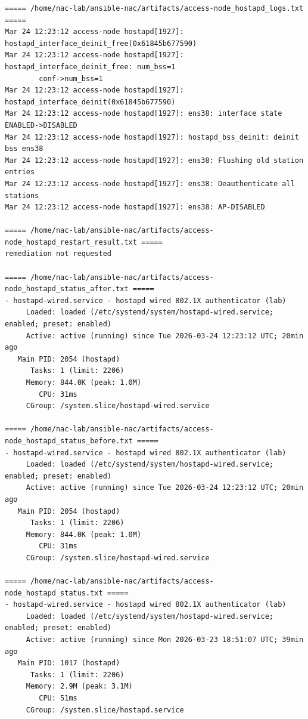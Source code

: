 \documentclass[11pt]{article}
\begin{document}
\begin{verbatim}
===== /home/nac-lab/ansible-nac/artifacts/access-node_hostapd_logs.txt =====
Mar 24 12:23:12 access-node hostapd[1927]: hostapd_interface_deinit_free(0x61845b677590)
Mar 24 12:23:12 access-node hostapd[1927]: hostapd_interface_deinit_free: num_bss=1 
        conf->num_bss=1
Mar 24 12:23:12 access-node hostapd[1927]: hostapd_interface_deinit(0x61845b677590)
Mar 24 12:23:12 access-node hostapd[1927]: ens38: interface state ENABLED->DISABLED
Mar 24 12:23:12 access-node hostapd[1927]: hostapd_bss_deinit: deinit bss ens38
Mar 24 12:23:12 access-node hostapd[1927]: ens38: Flushing old station entries
Mar 24 12:23:12 access-node hostapd[1927]: ens38: Deauthenticate all stations
Mar 24 12:23:12 access-node hostapd[1927]: ens38: AP-DISABLED

===== /home/nac-lab/ansible-nac/artifacts/access-node_hostapd_restart_result.txt =====
remediation not requested

===== /home/nac-lab/ansible-nac/artifacts/access-node_hostapd_status_after.txt =====
- hostapd-wired.service - hostapd wired 802.1X authenticator (lab)
     Loaded: loaded (/etc/systemd/system/hostapd-wired.service; enabled; preset: enabled)
     Active: active (running) since Tue 2026-03-24 12:23:12 UTC; 20min ago
   Main PID: 2054 (hostapd)
      Tasks: 1 (limit: 2206)
     Memory: 844.0K (peak: 1.0M)
        CPU: 31ms
     CGroup: /system.slice/hostapd-wired.service

===== /home/nac-lab/ansible-nac/artifacts/access-node_hostapd_status_before.txt =====
- hostapd-wired.service - hostapd wired 802.1X authenticator (lab)
     Loaded: loaded (/etc/systemd/system/hostapd-wired.service; enabled; preset: enabled)
     Active: active (running) since Tue 2026-03-24 12:23:12 UTC; 20min ago
   Main PID: 2054 (hostapd)
      Tasks: 1 (limit: 2206)
     Memory: 844.0K (peak: 1.0M)
        CPU: 31ms
     CGroup: /system.slice/hostapd-wired.service

===== /home/nac-lab/ansible-nac/artifacts/access-node_hostapd_status.txt =====
- hostapd-wired.service - hostapd wired 802.1X authenticator (lab)
     Loaded: loaded (/etc/systemd/system/hostapd-wired.service; enabled; preset: enabled)
     Active: active (running) since Mon 2026-03-23 18:51:07 UTC; 39min ago
   Main PID: 1017 (hostapd)
      Tasks: 1 (limit: 2206)
     Memory: 2.9M (peak: 3.1M)
        CPU: 51ms
     CGroup: /system.slice/hostapd.service


\end{verbatim}
\end{document}
